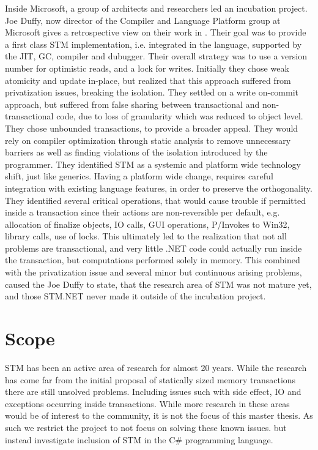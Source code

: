 Inside Microsoft, a group of architects and researchers led an incubation project. Joe Duffy, now director of the Compiler and Language Platform group at Microsoft gives a retrospective view on their work in \cite{duffy2010stmnet}. Their goal was to provide a first class \ac{STM} implementation, i.e. integrated in the language, supported by the \ac{JIT}, \ac{GC}, compiler and dubugger. Their overall strategy was to use a version number for optimistic reads, and a lock for writes. Initially they chose weak atomicity and update in-place, but realized that this approach suffered from privatization issues, breaking the isolation. They settled on a write on-commit approach, but suffered from false sharing between transactional and non-transactional code, due to loss of granularity which was reduced to object level. They chose unbounded transactions, to provide a broader appeal. They would rely on compiler optimization through static analysis to remove unnecessary barriers as well as finding violations of the isolation introduced by the programmer. They identified \ac{STM} as a systemic and platform wide technology shift, just like generics. Having a platform wide change, requires careful integration with existing language features, in order to preserve the orthogonality. They identified several critical operations, that would cause trouble if permitted inside a transaction since their actions are non-reversible per default, e.g. allocation of finalize objects, \ac{IO} calls, GUI operations, P/Invokes to Win32, library calls, use of locks. This ultimately led to the realization that not all problems are transactional, and very little .NET code could actually run inside the transaction, but computations performed solely in memory. This combined with the privatization issue and several minor but continuous arising problems, caused the Joe Duffy to state, that the research area of \ac{STM} was not mature yet, and those STM.NET never made it outside of the incubation project.


\section{Scope}
\ac{STM} has been an active area of research for almost 20 years\cite{shavit1997software}. While the research has come far from the initial proposal of statically sized memory transactions there are still unsolved problems. Including issues such with side effect, \ac{IO} and exceptions occurring inside transactions. While more research in these areas would be of interest to the community, it is not the focus of this master thesis. As such we restrict the project to not focus on solving these known issues. but instead investigate inclusion of \ac{STM} in the C\# programming language.

